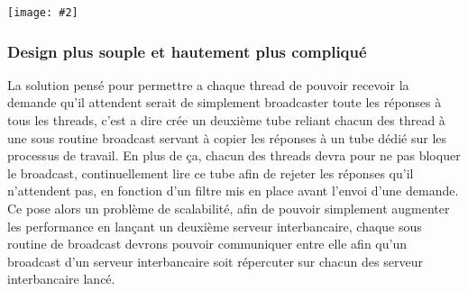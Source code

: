 \documentclass[french, a4paper, 12pt, titlepage]{article}
\newcommand{\graph}[2]{
\medskip
	\begin{center}
		\texttt{[image: \#2]}
	\end{center}
\medskip
}
\begin{document}
\graph{0.4}{piscine}


\subsubsection{Design plus souple et hautement plus compliqué}
La solution pensé pour permettre a chaque thread de pouvoir recevoir la demande qu'il attendent serait de simplement broadcaster toute les réponses à tous les threads, c'est a dire crée un deuxième tube reliant chacun des thread à une sous routine \og broadcast\fg{} servant à copier les réponses à un tube dédié sur les processus de travail.
En plus de ça, chacun des threads devra pour ne pas bloquer le broadcast, continuellement lire ce tube afin de rejeter les réponses qu'il n'attendent pas, en fonction d'un filtre mis en place avant l'envoi d'une demande.\\
\noindent
Ce pose alors un problème de scalabilité, afin de pouvoir simplement augmenter les performance en lançant un deuxième serveur interbancaire, chaque sous routine de broadcast devrons pouvoir communiquer entre elle afin qu'un broadcast d'un serveur interbancaire soit répercuter sur chacun des serveur interbancaire lancé.
\end{document}
